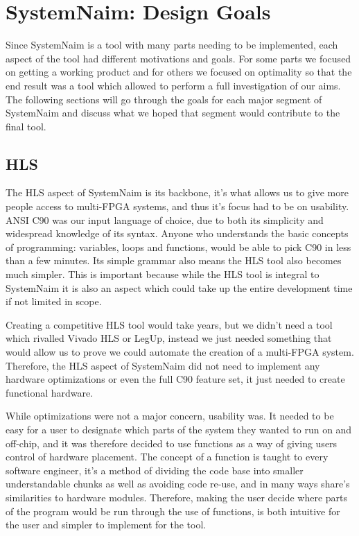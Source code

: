 \chapter{SystemNaim: Design Goals}

Since SystemNaim is a tool with many parts needing to be implemented, each aspect of the tool had different motivations and goals. For some parts we focused on getting a working product and for others we focused on optimality so that the end result was a tool which allowed to perform a full investigation of our aims. The following sections will go through the goals for each major segment of SystemNaim and discuss what we hoped that segment would contribute to the final tool.

\section{HLS}

The HLS aspect of SystemNaim is its backbone, it's what allows us to give more people access to multi-FPGA systems, and thus it's focus had to be on usability. ANSI C90 was our input language of choice, due to both its simplicity and widespread knowledge of its syntax. Anyone who understands the basic concepts of programming: variables, loops and functions, would be able to pick C90 in less than a few minutes. Its simple grammar also means the HLS tool also becomes much simpler. This is important because while the HLS tool is integral to SystemNaim it is also an aspect which could take up the entire development time if not limited in scope. 

Creating a competitive HLS tool would take years, but we didn't need a tool which rivalled Vivado HLS or LegUp, instead we just needed something that would allow us to prove we could automate the creation of a multi-FPGA system. Therefore, the HLS aspect of SystemNaim did not need to implement any hardware optimizations or even the full C90 feature set, it just needed to create functional hardware.

While optimizations were not a major concern, usability was. It needed to be easy for a user to designate which parts of the system they wanted to run on and off-chip, and it was therefore decided to use functions as a way of giving users control of hardware placement. The concept of a function is taught to every software engineer, it's a method of dividing the code base into smaller understandable chunks as well as avoiding code re-use, and in many ways share's similarities to hardware modules. Therefore, making the user decide where parts of the program would be run through the use of functions, is both intuitive for the user and simpler to implement for the tool.

